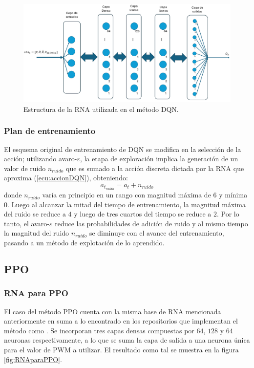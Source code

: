 \begin{figure}[hh]
	\centering
	\includegraphics[scale=0.38]{fig/new/RNADQN.png}
	\caption{Estructura de la RNA utilizada en el método DQN.}
	\label{fig:RNAparaDQN}
\end{figure}

\subsubsection{Plan de entrenamiento}

El esquema original de entrenamiento de DQN se modifica en la selección de la acción; utilizando avaro-$\varepsilon$, la etapa de exploración implica la generación de un valor de ruido $n_{ruido}$ que es sumado a la acción discreta dictada por la RNA que aproxima (\ref{ecu:accionDQN}), obteniendo:
\begin{equation}
a_{t_{ruido}} = a_t + n_{ruido}
\end{equation}
donde $n_{ruido}$ varía en principio en un rango con magnitud máxima de $6$ y mínima $0$. Luego al alcanzar la mitad del tiempo de entrenamiento, la magnitud máxima del ruido se reduce a $4$ y luego de tres cuartos del tiempo se reduce a $2$. Por lo tanto, el avaro-$\varepsilon$ reduce las probabilidades de adición de ruido y al mismo tiempo la magnitud del ruido $n_{ruido}$ se diminuye con el avance del entrenamiento, pasando a un método de explotación de lo aprendido.

\subsection{PPO}

\subsubsection{RNA para PPO}

El caso del método PPO cuenta con la misma base de RNA mencionada anteriormente en suma a lo encontrado en los repositorios que implementan el método como \cite{PPOcoding}. Se incorporan tres capas densas compuestas por $64$, $128$ y $64$ neuronas respectivamente, a lo que se suma la capa de salida a una neurona única para el valor de PWM a utilizar. El resultado como tal se muestra en la figura \ref{fig:RNAparaPPO}.

